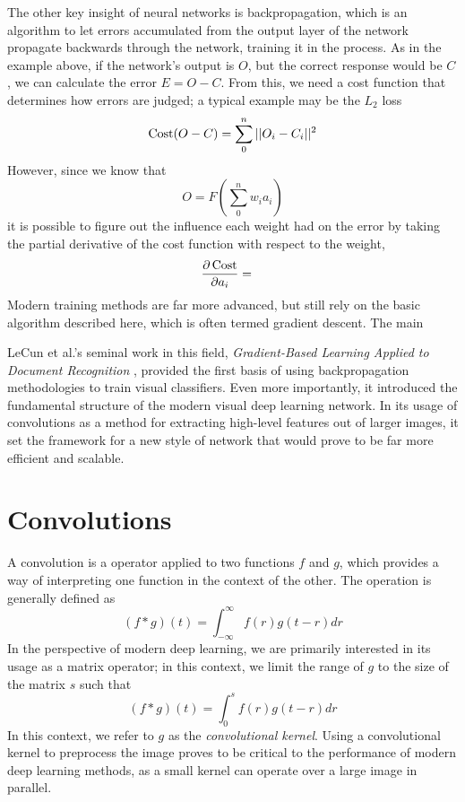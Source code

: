 The other key insight of neural networks is backpropagation, which is an algorithm to let errors accumulated from the output layer of the network propagate backwards through the network, training it in the process.
As in the example above, if the network's output is $O$, but the correct response would be $C$, we can calculate the error $E = O - C$.
From this, we need a cost function that determines how errors are judged; a typical example may be the $L_2$ loss
\[\operatorname{Cost}(O - C) = \sum_0^n || O_i - C_i ||^2 \]
However, since we know that
\[O = F\left(\sum_0^n w_i a_i\right)\]
it is possible to figure out the influence each weight had on the error by taking the partial derivative of the cost function with respect to the weight,
\begin{align*}
\frac{\partial \operatorname{Cost}}{\partial a_i} &= 
\end{align*}
Modern training methods are far more advanced, but still rely on the basic algorithm described here, which is often termed gradient descent.
The main 

LeCun et al.'s seminal work in this field, \emph{Gradient-Based Learning Applied to Document Recognition} \cite{lecun1998gradient}, provided the first basis of using backpropagation methodologies to train visual classifiers.
Even more importantly, it introduced the fundamental structure of the modern visual deep learning network.
In its usage of convolutions as a method for extracting high-level features out of larger images, it set the framework for a new style of network that would prove to be far more efficient and scalable.

\section{Convolutions}
A convolution is a operator applied to two functions $f$ and $g$, which provides a way of interpreting one function in the context of the other.
The operation is generally defined as
\[(f * g)(t) = \int_{-\infty}^\infty f(r)g(t-r) dr\]
In the perspective of modern deep learning, we are primarily interested in its usage as a matrix operator; in this context, we limit the range of $g$ to the size of the matrix $s$ such that
\[(f * g)(t) = \int_0^s f(r)g(t-r) dr\]
In this context, we refer to $g$ as the \emph{convolutional kernel}.
Using a convolutional kernel to preprocess the image proves to be critical to the performance of modern deep learning methods, as a small kernel can operate over a large image in parallel.

